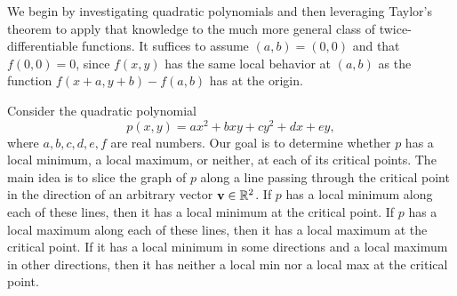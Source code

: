 \documentclass{watsonbook}
\begin{document}
  \begin{pf}
    We begin by investigating quadratic polynomials and then
    leveraging Taylor's theorem to apply that knowledge to the much
    more general class of twice-differentiable functions. It suffices
    to assume $(a,b) = (0,0)$ and that $f(0,0) = 0$, since $f(x,y)$
    has the same local behavior at $(a,b)$ as the function
    $f(x+a, y+b)-f(a,b)$ has at the origin.
    
    Consider the quadratic polynomial 
    \[
      p(x,y) = ax^2  + b xy + cy^2 + dx + ey, 
    \]
    where $a,b,c,d,e,f$ are real numbers.  Our goal is to determine
    whether $p$ has a local minimum, a local maximum, or neither, at
    each of its critical points. The main idea is to slice the graph
    of $p$ along a line passing through the critical point in the
    direction of an arbitrary vector $\mathbf{v} \in \mathbb{R}^2$. If $p$ has
    a local minimum along each of these lines, then it has a local
    minimum at the critical point.  If $p$ has a local maximum along
    each of these lines, then it has a local maximum at the critical
    point. If it has a local minimum in some directions and a local
    maximum in other directions, then it has neither a local min nor a
    local max at the critical point.
    

\end{pf}
\end{document}
